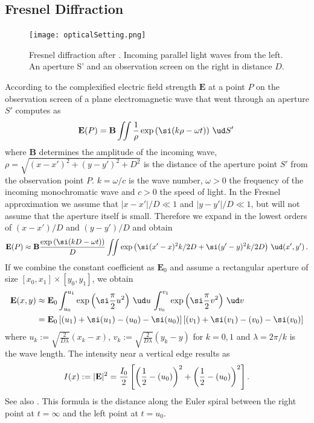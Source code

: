 \documentclass[12pt]{article}
\newcommand\defbf[2]{\def#1{{\mathbf{#2}}}}
\let\C=\relax
\DeclareMathOperator\C{C} %
\def\d#1{{\,\ud#1\,}}
\let\S=\relax
\DeclareMathOperator\S{S} %
\begin{document}
\subsection{Fresnel Diffraction}
\defbf\E{E}
\defbf\B{B}
\begin{figure}[h!]
	\centering
	\texttt{[image: opticalSetting.png]} \\
	\label{f:FresnelDiffraction}
	\caption{Fresnel diffraction after \cite[ch.~8.1]{Zim08}. Incoming parallel light waves from the left.  An aperture S' and an observation screen on the right in distance $D$.}
\end{figure}
According to \cite[ch.~7]{Zim08} the complexified electric field strength $\E$ at a point $P$ on the observation screen of a plane electromagnetic wave that went through an aperture $S'$ computes as
\[  \E(P) = \B\iint  \frac1\rho \exp\left(\si(k\rho-\omega t)\right) \d{S'}
\] where $\B$ determines the amplitude of the incoming wave,\\ $\rho=\sqrt{(x-x')^2+(y-y')^2+D^2}$ is the distance of the aperture point $S'$ from the observation point $P$.  $k=\omega/c$ is the wave number, $\omega>0$ the frequency of the incoming monochromatic wave and $c>0$ the speed of light.  In the Fresnel approximation we assume that $|x-x'|/D\ll 1$ and $|y-y'|/D\ll 1$, but will not assume that the aperture itself is small.  Therefore we expand in the lowest orders of $(x-x')/D$ and $(y-y')/D$ and obtain
\[  \E(P) \approx \B\frac{\exp\left(\si(kD-\omega t)\right)}{D} \iint \exp\left(\si(x'-x)^2k/2D +\si(y'-y)^2k/2D\right) \d{(x',y')}.
\]  If we combine the constant coefficient as $\E_0$ and assume a rectangular aperture of size $[x_0,x_1]\times[y_0,y_1]$, we obtain
\begin{align*}  \E(x,y) &\approx \E_0 \int_{u_0}^{u_1} \exp\left(\si\frac\pi2 u^2\right)\d{u} \int_{v_0}^{v_1} \exp\left(\si\frac\pi2 v^2\right) \d{v} \\
  &= \E_0 \left[\C(u_1)+\si\S(u_1)-\C(u_0)-\si\S(u_0)\right] \left[\C(v_1)+\si\S(v_1)-\C(v_0)-\si\S(v_0)\right]
\end{align*} where $u_k:=\sqrt{\frac2{D\lambda}}(x_k-x)$, $v_k:= \sqrt{\frac2{D\lambda}}(y_k-y)$ for $k=0,1$ \cite[Eqns.~(8.34a\&b)]{Zim08} and $\lambda=2\pi/k$ is the wave length.  The intensity near a vertical edge results as
\[  I(x):= |\E|^2 = \frac{I_0}{2} \left[\left(\frac12-\C(u_0)\right)^2+\left(\frac12-\S(u_0)\right)^2\right].
\] See also \cite[Eqn.~(8.38)]{Zim08}.  This formula is the distance along the Euler spiral between the right point at $t=\infty$ and the left point at $t=u_0$.
\end{document}
